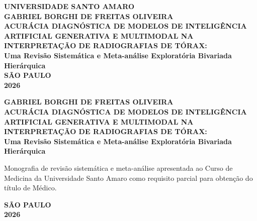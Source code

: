 \documentclass[12pt,a4paper]{article}
\begin{document}
\pagestyle{empty}

\begin{titlepage}
\begin{center}
    {\large \textbf{UNIVERSIDADE SANTO AMARO}} \\
    \vspace{4cm}
    {\large \textbf{GABRIEL BORGHI DE FREITAS OLIVEIRA}} \\
    \vspace{3.5cm}
    {\Large \textbf{ACURÁCIA DIAGNÓSTICA DE MODELOS DE INTELIGÊNCIA ARTIFICIAL GENERATIVA E MULTIMODAL NA INTERPRETAÇÃO DE RADIOGRAFIAS DE TÓRAX:}} \\
    \vspace{0.5cm}
    {\large \textbf{Uma Revisão Sistemática e Meta-análise Exploratória Bivariada Hierárquica}} \\
    \vfill
    {\large \textbf{SÃO PAULO}} \\
    {\large \textbf{2026}}
\end{center}
\end{titlepage}

\begin{titlepage}
\begin{center}
    {\large \textbf{GABRIEL BORGHI DE FREITAS OLIVEIRA}} \\
    \vspace{3.5cm}
    {\Large \textbf{ACURÁCIA DIAGNÓSTICA DE MODELOS DE INTELIGÊNCIA ARTIFICIAL GENERATIVA E MULTIMODAL NA INTERPRETAÇÃO DE RADIOGRAFIAS DE TÓRAX:}} \\
    \vspace{0.5cm}
    {\large \textbf{Uma Revisão Sistemática e Meta-análise Exploratória Bivariada Hierárquica}} \\
    \vspace{2.5cm}
    \hspace{.45\textwidth}
    \begin{minipage}{.5\textwidth}
        \begin{singlespace}
            \small Monografia de revisão sistemática e meta-análise apresentada ao Curso de Medicina da Universidade Santo Amaro como requisito parcial para obtenção do título de Médico.
        \end{singlespace}
    \end{minipage}
    \vfill
    {\large \textbf{SÃO PAULO}} \\
    {\large \textbf{2026}}
\end{center}
\end{titlepage}
\setcounter{page}{2}
\end{document}
